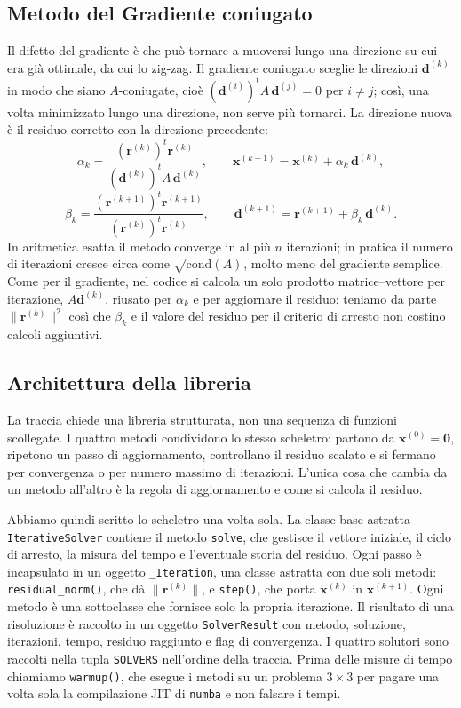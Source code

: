 \documentclass[11pt,a4paper]{article}
\begin{document}
\subsection{Metodo del Gradiente coniugato}
Il difetto del gradiente è che può tornare a muoversi lungo una direzione su cui
era già ottimale, da cui lo zig-zag. Il gradiente coniugato sceglie le direzioni
$\mathbf{d}^{(k)}$ in modo che siano $A$-coniugate, cioè
$(\mathbf{d}^{(i)})^{t}A\,\mathbf{d}^{(j)}=0$ per $i\neq j$; così, una volta
minimizzato lungo una direzione, non serve più tornarci. La direzione nuova è il
residuo corretto con la direzione precedente:
\[
\alpha_k=\frac{(\mathbf{r}^{(k)})^{t}\mathbf{r}^{(k)}}
{(\mathbf{d}^{(k)})^{t}A\,\mathbf{d}^{(k)}},\qquad
\mathbf{x}^{(k+1)}=\mathbf{x}^{(k)}+\alpha_k\,\mathbf{d}^{(k)},
\]
\[
\beta_k=\frac{(\mathbf{r}^{(k+1)})^{t}\mathbf{r}^{(k+1)}}
{(\mathbf{r}^{(k)})^{t}\mathbf{r}^{(k)}},\qquad
\mathbf{d}^{(k+1)}=\mathbf{r}^{(k+1)}+\beta_k\,\mathbf{d}^{(k)}.
\]
In aritmetica esatta il metodo converge in al più $n$ iterazioni; in pratica il
numero di iterazioni cresce circa come $\sqrt{\mathrm{cond}(A)}$, molto meno del
gradiente semplice. Come per il gradiente, nel codice si calcola un solo prodotto
matrice--vettore per iterazione, $A\mathbf{d}^{(k)}$, riusato per $\alpha_k$ e per
aggiornare il residuo; teniamo da parte $\|\mathbf{r}^{(k)}\|^2$ così che
$\beta_k$ e il valore del residuo per il criterio di arresto non costino calcoli
aggiuntivi.

\subsection{Architettura della libreria}
La traccia chiede una libreria strutturata, non una sequenza di funzioni scollegate.
I quattro metodi condividono lo stesso scheletro: partono da $\mathbf{x}^{(0)}=\mathbf{0}$,
ripetono un passo di aggiornamento, controllano il residuo scalato
e si fermano per convergenza o per numero massimo di iterazioni. L'unica cosa che
cambia da un metodo all'altro è la regola di aggiornamento e come si calcola il
residuo.

Abbiamo quindi scritto lo scheletro una volta sola. La classe base astratta
\texttt{IterativeSolver} contiene il metodo \texttt{solve}, che gestisce il
vettore iniziale, il ciclo di arresto, la misura del tempo e l'eventuale storia
del residuo. Ogni passo è incapsulato in un oggetto \texttt{\_Iteration}, una
classe astratta con due soli metodi: \texttt{residual\_norm()}, che dà
$\|\mathbf{r}^{(k)}\|$, e \texttt{step()}, che porta $\mathbf{x}^{(k)}$ in
$\mathbf{x}^{(k+1)}$. Ogni metodo è una sottoclasse che fornisce solo la propria
iterazione. Il risultato di una risoluzione è raccolto in un oggetto
\texttt{SolverResult} con metodo, soluzione, iterazioni, tempo, residuo
raggiunto e flag di convergenza. I quattro solutori sono raccolti nella tupla
\texttt{SOLVERS} nell'ordine della traccia. Prima delle misure di tempo chiamiamo
\texttt{warmup()}, che esegue i metodi su un problema $3\times3$ per pagare una
volta sola la compilazione JIT di \texttt{numba} e non falsare i tempi.
\end{document}
